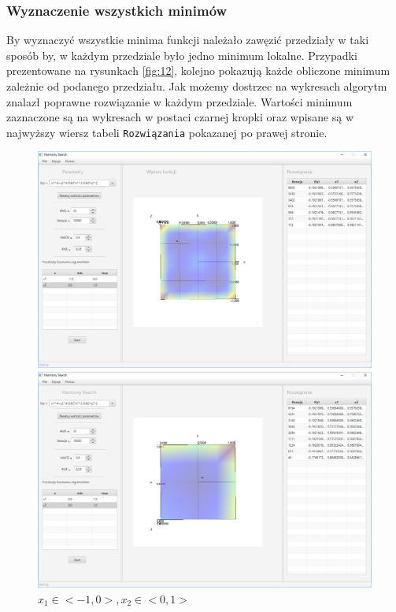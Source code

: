 \documentclass[10pt, a4paper]{article}
\begin{document}
\subsubsection{Wyznaczenie wszystkich minimów}
\label{subsubsec:fcn4min2}
By wyznaczyć wszystkie minima funkcji należało zawęzić przedziały w taki sposób by, w każdym przedziale było jedno minimum lokalne. Przypadki prezentowane na rysunkach \ref{fig:12}, kolejno pokazują każde obliczone minimum zależnie od podanego przedziału. Jak możemy dostrzec na wykresach algorytm znalazł poprawne rozwiązanie w każdym przedziale. Wartości minimum zaznaczone są na wykresach w postaci czarnej kropki oraz wpisane są w najwyższy wiersz tabeli {\tt Rozwiązania} pokazanej po prawej stronie. 
\begin{figure}[htbp]
	\begin{minipage}[b]{.5\textwidth}
		\centering
		\includegraphics[width=\linewidth]{images/16.PNG}
		\caption{$x_{1}\in<-1,0>,  x_{2}\in<0,1>$}
	\end{minipage}
	\begin{minipage}[b]{.5\textwidth}
		\centering
		\includegraphics[width=\linewidth]{images/12.PNG}

\end{minipage}
\end{figure}
\end{document}
